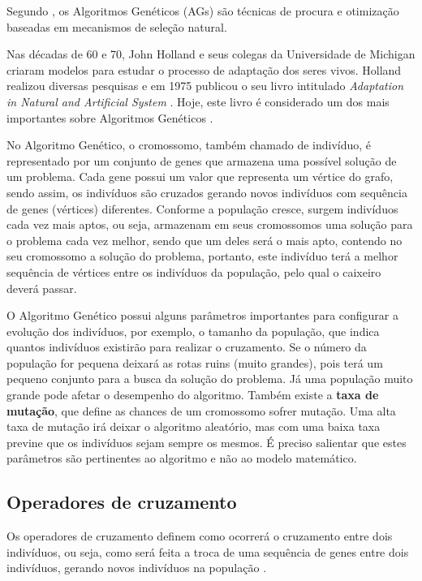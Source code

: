 \documentclass[12pt,openright,a4paper,oneside]{tcc}
\begin{document}
		Segundo , os Algoritmos Genéticos (AGs) são técnicas de procura e otimização baseadas em mecanismos de seleção natural. 

		Nas décadas de 60 e 70, John Holland e seus colegas da Universidade de Michigan criaram modelos para estudar o processo de adaptação dos seres vivos. Holland realizou diversas pesquisas e em 1975 publicou o seu livro intitulado \textit{Adaptation in Natural and Artificial System} \cite{john}. Hoje, este livro é considerado um dos mais importantes sobre Algoritmos Genéticos \cite{0001-pdf}.

		No Algoritmo Genético, o cromossomo, também chamado de indivíduo, é representado por um conjunto de genes que armazena uma possível solução de um problema. Cada gene possui um valor que representa um vértice do grafo, sendo assim, os indivíduos são cruzados gerando novos indivíduos com sequência de genes (vértices) diferentes. Conforme a população cresce, surgem indivíduos cada vez mais aptos, ou seja, armazenam em seus cromossomos uma solução para o problema cada vez melhor, sendo que um deles será o mais apto, contendo no seu cromossomo a solução do problema, portanto, este indivíduo terá a melhor sequência de vértices entre os indivíduos da população, pelo qual o caixeiro deverá passar.

		O Algoritmo Genético possui alguns parâmetros importantes para configurar a evolução dos indivíduos, por exemplo, o tamanho da população, que indica quantos indivíduos existirão para realizar o cruzamento. Se o número da população for pequena deixará as rotas ruins (muito grandes), pois terá um pequeno conjunto para a busca da solução do problema. Já uma população muito grande pode afetar o desempenho do algoritmo. Também  existe a \textbf{taxa de mutação}, que define as chances de um cromossomo sofrer mutação. Uma alta taxa de mutação irá deixar o algoritmo aleatório, mas com uma baixa taxa previne que os indivíduos sejam sempre os mesmos. É preciso salientar que estes parâmetros são pertinentes ao algoritmo e não ao modelo matemático.

		\subsection{Operadores de cruzamento}

			Os operadores de cruzamento definem como ocorrerá o cruzamento entre dois indivíduos, ou seja, como será feita a troca de uma sequência de genes entre dois indivíduos, gerando novos indivíduos na população \cite{0012-pdf}.
\end{document}
